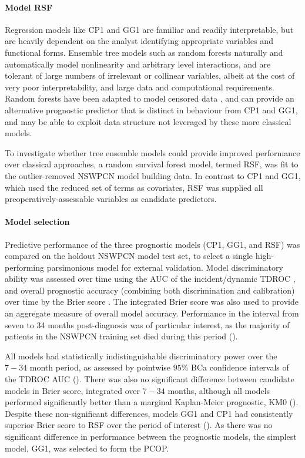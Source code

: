 \documentclass[dissertation.tex]{subfiles}
\begin{document}
\paragraph{Model RSF}
Regression models like CP1 and GG1 are familiar and readily interpretable, but are heavily dependent on the analyst identifying appropriate variables and functional forms.  Ensemble tree models such as random forests \cite{Breiman2001} naturally and automatically model nonlinearity and arbitrary level interactions, and are tolerant of large numbers of irrelevant or collinear variables, albeit at the cost of very poor interpretability, and large data and computational requirements.  Random forests have been adapted to model censored data \cite{Ishwaran2008}, and can provide an alternative prognostic predictor that is distinct in behaviour from CP1 and GG1, and may be able to exploit data structure not leveraged by these more classical models.

To investigate whether tree ensemble models could provide improved performance over classical approaches, a random survival forest model, termed RSF, was fit to the outlier-removed \gls{NSWPCN} model building data.  In contrast to CP1 and GG1, which used the reduced set of terms as covariates, RSF was supplied all preoperatively-assessable variables as candidate predictors.

\paragraph{Model selection}
Predictive performance of the three prognostic models (CP1, GG1, and RSF) was compared on the holdout \gls{NSWPCN} model test set, to select a single high-performing parsimonious model for external validation.  Model discriminatory ability was assessed over time using the \gls{AUC} of the incident/dynamic \gls{TDROC} \cite{Heagerty2005}, and overall prognostic accuracy (combining both discrimination and calibration) over time by the Brier score \cite{Graf1999}.  The integrated Brier score \cite{Graf1999} was also used to provide an aggregate measure of overall model accuracy.  Performance in the interval from seven to 34 months post-diagnosis was of particular interest, as the majority of patients in the \gls{NSWPCN} training set died during this period ().

All models had statistically indistinguishable discriminatory power over the $7-34$ month period, as assessed by pointwise $95\%$ BCa confidence intervals \cite{Efron1987} of the \gls{TDROC} \gls{AUC} ().  There was also no significant difference between candidate models in Brier score, integrated over $7-34$ months, although all models performed significantly better than a marginal Kaplan-Meier prognostic, KM0 ().  Despite these non-significant differences, models GG1 and CP1 had consistently superior Brier score to RSF over the period of interest ().  As there was no significant difference in performance between the prognostic models, the simplest model, GG1, was selected to form the \gls{PCOP}.
\end{document}

